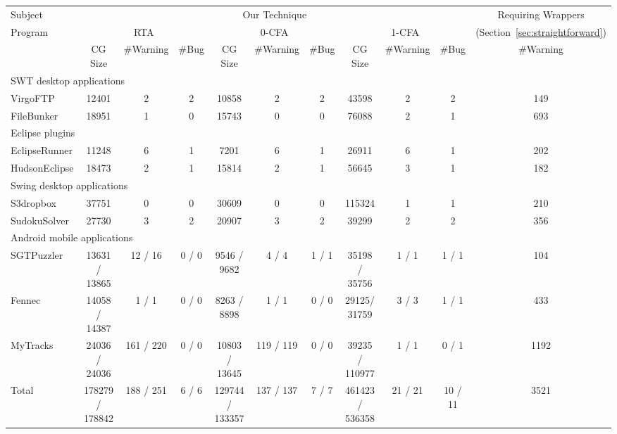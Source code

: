 \begin{table*}[ht]
\begin{center}
 \fontsize{9pt}{\baselineskip}\selectfont
\hspace*{-0.2cm}
\setlength{\tabcolsep}{.15\tabcolsep}
\begin{tabular}{|l||c|c|c||c|c|c||c|c|c||c|}
\hline
 Subject&  \multicolumn{9}{|c||}{Our Technique} & Requiring Wrappers  \\
\cline{2-10}
 Program  &  \multicolumn{3}{|c|}{RTA }& \multicolumn{3}{|c|}{0-CFA } & \multicolumn{3}{|c||}{1-CFA } & (Section~\ref{sec:straightforward})  \\
\cline{2-11}
 & CG Size & \#Warning & \#Bug & CG Size & \#Warning & \#Bug & CG Size & \#Warning & \#Bug & \#Warning \\
\hline \hline
\multicolumn{11}{|l|}{SWT desktop applications}   \\
 \hline
 VirgoFTP&  12401 &  2 &  2 & 10858 & 2 & 2 & 43598 & 2 & 2& 149  \\
 \hline
 FileBunker &  18951 &  1 &  0 & 15743 & 0 & 0 & 76088 & 2 & 1& 693  \\
 \hline
 \hline
\multicolumn{11}{|l|}{Eclipse plugins}   \\
 \hline
 EclipseRunner&  11248&  6 &  1 & 7201 & 6 & 1 & 26911 & 6 & 1& 202  \\
 \hline
 HudsonEclipse& 18473 &  2 &  1 & 15814 & 2 & 1& 56645 & 3 & 1 & 182 \\
 \hline
 \hline
\multicolumn{11}{|l|}{Swing desktop applications}   \\
 \hline
 S3dropbox & 37751 &  0 &  0 & 30609 & 0 & 0 & 115324 & 1 & 1 & 210  \\
 \hline
  SudokuSolver&  27730&  3 &  2 & 20907 & 3 & 2 & 39299 & 2 & 2 & 356  \\
 \hline
 \hline
\multicolumn{11}{|l|}{Android mobile applications}   \\
 \hline
 SGTPuzzler & 13631 / 13865&  12 / 16 &  0 / 0 & 9546 / 9682& 4 / 4& 1 / 1 & 35198 / 35756 & 1 / 1  & 1 / 1& 104 \\
 \hline
 Fennec & 14058 / 14387 &  1 / 1 &  0 / 0 & 8263 / 8898 & 1 / 1 & 0 / 0& 29125/ 31759 & 3 / 3 & 1 / 1& 433 \\
 \hline
 MyTracks & 24036 / 24036 &  161 / 220 & 0 / 0 & 10803 / 13645 & 119 / 119 & 0 / 0 & 39235 / 110977 & 1 / 1 & 0 / 1 & 1192 \\
\hline
\hline
 Total & 178279 / 178842 &  188 / 251 & 6 / 6 & 129744 / 133357 & 137 / 137& 7 / 7 & 461423 / 536358& 21 / 21 & 10 / 11 & 3521 \\

\end{tabular}
\end{center}
\end{table*}
